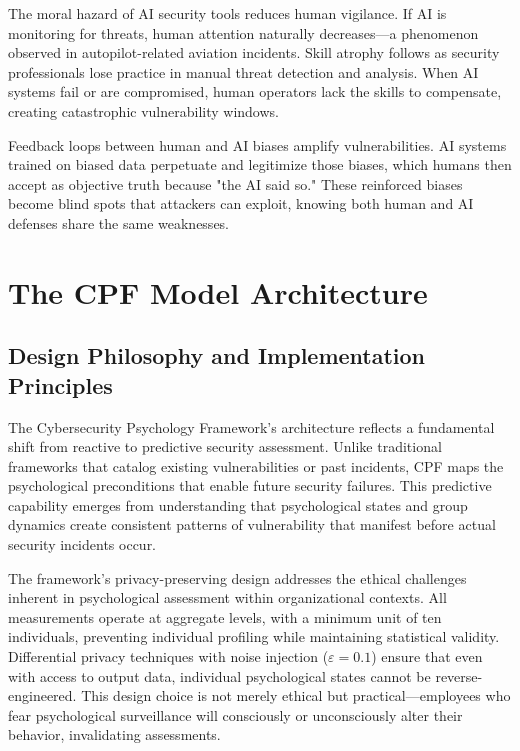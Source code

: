 \documentclass[11pt,a4paper]{article}
\begin{document}
The moral hazard of AI security tools reduces human vigilance. If AI is monitoring for threats, human attention naturally decreases—a phenomenon observed in autopilot-related aviation incidents. Skill atrophy follows as security professionals lose practice in manual threat detection and analysis. When AI systems fail or are compromised, human operators lack the skills to compensate, creating catastrophic vulnerability windows.

Feedback loops between human and AI biases amplify vulnerabilities. AI systems trained on biased data perpetuate and legitimize those biases, which humans then accept as objective truth because "the AI said so." These reinforced biases become blind spots that attackers can exploit, knowing both human and AI defenses share the same weaknesses.

\section{The CPF Model Architecture}

\subsection{Design Philosophy and Implementation Principles}

The Cybersecurity Psychology Framework's architecture reflects a fundamental shift from reactive to predictive security assessment. Unlike traditional frameworks that catalog existing vulnerabilities or past incidents, CPF maps the psychological preconditions that enable future security failures. This predictive capability emerges from understanding that psychological states and group dynamics create consistent patterns of vulnerability that manifest before actual security incidents occur.

The framework's privacy-preserving design addresses the ethical challenges inherent in psychological assessment within organizational contexts. All measurements operate at aggregate levels, with a minimum unit of ten individuals, preventing individual profiling while maintaining statistical validity. Differential privacy techniques with noise injection ($\varepsilon = 0.1$) ensure that even with access to output data, individual psychological states cannot be reverse-engineered. This design choice is not merely ethical but practical—employees who fear psychological surveillance will consciously or unconsciously alter their behavior, invalidating assessments.
\end{document}
